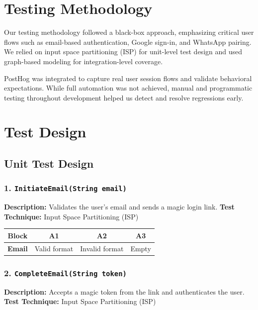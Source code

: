 \section{Testing Methodology}

Our testing methodology followed a black-box approach, emphasizing critical user flows such as email-based authentication, Google sign-in, and WhatsApp pairing. We relied on input space partitioning (ISP) for unit-level test design and used graph-based modeling for integration-level coverage.

PostHog was integrated to capture real user session flows and validate behavioral expectations. While full automation was not achieved, manual and programmatic testing throughout development helped us detect and resolve regressions early.

\section{Test Design}

\subsection*{Unit Test Design}

\subsubsection*{1. \texttt{InitiateEmail(String email)}}

\textbf{Description:} Validates the user’s email and sends a magic login link.  
\textbf{Test Technique:} Input Space Partitioning (ISP)

\begin{table}[h!]
\centering
\begin{tabular}{|c|c|c|c|}
\hline
\textbf{Block} & \textbf{A1} & \textbf{A2} & \textbf{A3} \\
\hline
\textbf{Email} & Valid format & Invalid format & Empty \\
\hline
\end{tabular}
\end{table}

\subsubsection*{2. \texttt{CompleteEmail(String token)}}

\textbf{Description:} Accepts a magic token from the link and authenticates the user.  
\textbf{Test Technique:} Input Space Partitioning (ISP)

